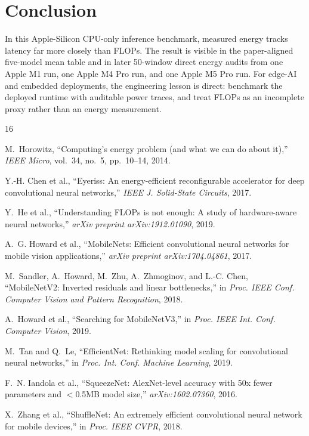 \documentclass[conference]{IEEEtran}
\begin{document}
\section{Conclusion}

In this Apple-Silicon CPU-only inference benchmark, measured energy tracks
latency far more closely than FLOPs. The result is visible in the
paper-aligned five-model mean table and in later 50-window direct energy
audits from one Apple M1 run, one Apple M4 Pro run, and one Apple M5 Pro run.
For edge-AI and embedded deployments, the engineering lesson is direct:
benchmark the deployed runtime with auditable power traces, and treat FLOPs as
an incomplete proxy rather than an energy measurement.

\begin{thebibliography}{16}

M.~Horowitz, ``Computing's energy problem (and what we can do about it),''
\emph{IEEE Micro}, vol.~34, no.~5, pp.~10--14, 2014.

Y.-H. Chen et al., ``Eyeriss: An energy-efficient reconfigurable accelerator
for deep convolutional neural networks,'' \emph{IEEE J. Solid-State Circuits},
2017.

Y.~He et al., ``Understanding FLOPs is not enough: A study of hardware-aware
neural networks,'' \emph{arXiv preprint arXiv:1912.01090}, 2019.

A.~G. Howard et al., ``MobileNets: Efficient convolutional neural networks for
mobile vision applications,'' \emph{arXiv preprint arXiv:1704.04861}, 2017.

M.~Sandler, A.~Howard, M.~Zhu, A.~Zhmoginov, and L.-C. Chen,
``MobileNetV2: Inverted residuals and linear bottlenecks,'' in
\emph{Proc. IEEE Conf. Computer Vision and Pattern Recognition}, 2018.

A.~Howard et al., ``Searching for MobileNetV3,'' in
\emph{Proc. IEEE Int. Conf. Computer Vision}, 2019.

M.~Tan and Q.~Le, ``EfficientNet: Rethinking model scaling for convolutional
neural networks,'' in \emph{Proc. Int. Conf. Machine Learning}, 2019.

F.~N. Iandola et al., ``SqueezeNet: AlexNet-level accuracy with 50x fewer
parameters and $<$0.5MB model size,'' \emph{arXiv:1602.07360}, 2016.

X.~Zhang et al., ``ShuffleNet: An extremely efficient convolutional neural
network for mobile devices,'' in \emph{Proc. IEEE CVPR}, 2018.


\end{thebibliography}
\end{document}
